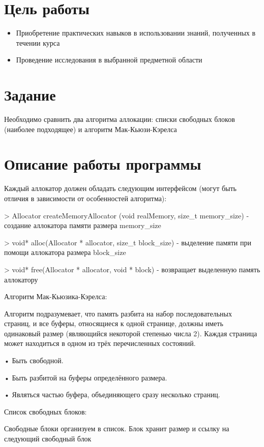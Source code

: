 \documentclass[a4paper, 12pt]{article}
\begin{document}
\section{Цель работы}
\begin{itemize}
  \item Приобретение практических навыков в использовании знаний, полученных в течении 
  курса
  \item Проведение исследования в выбранной предметной области
\end{itemize}

\section{Задание}
Необходимо сравнить два алгоритма аллокации: списки свободных блоков (наиболее 
подходящее) и алгоритм Мак-Кьюзи-Кэрелса

\section{Описание работы программы}
Каждый аллокатор должен обладать следующим интерфейсом (могут быть отличия в зависимости от 
особенностей алгоритма):

    > Allocator createMemoryAllocator (void realMemory, size\_t memory\_size) - создание аллокатора памяти размера memory\_size

    > void* alloc(Allocator * allocator, size\_t block\_size) - выделение памяти при помощи аллокатора размера block\_size

    > void* free(Allocator * allocator, void * block) - возвращает выделенную память аллокатору

Алгоритм Мак-Кьюзика-Кэрелса:

    Алгоритм подразумевает, что память разбита на набор последовательных страниц, и все буферы, относящиеся к одной странице, должны иметь одинаковый размер (являющийся некоторой степенью числа 2).
    Каждая страница может находиться в одном из трёх перечисленных состояний.

    •	Быть свободной. 

    •	Быть разбитой на буферы определённого размера.

    •	Являться частью буфера, объединяющего сразу несколько страниц. 
    
    
Список свободных блоков:

Свободные блоки организуем в список. 
Блок хранит размер и ссылку на следующий свободный блок
\end{document}
